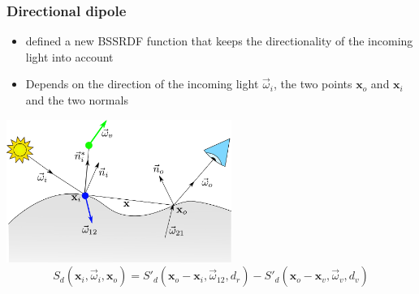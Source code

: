\documentclass{beamer}
\newcommand{\vomega}{\vec{\omega}}
\newcommand{\x}{\mathbf{x}}
\begin{document}
\begin{frame}
    \frametitle{Directional dipole}
		\vspace{0.3cm}
			\begin{itemize}
				\item \citep{IMM2013-06646} defined a new BSSRDF function that keeps the directionality of the incoming light into account \\		
				\item Depends on the direction of the incoming light $\vomega_i$, the two points $\x_o$ and $\x_i$ and the two normals
			\end{itemize}
				\centering
				\vspace{0.2cm}
				\includegraphics[width=0.55\textwidth]{jeppe}
			$$
			S_d(\x_i, \vomega_i, \x_o) = S'_d(\x_o - \x_i, \vomega_{12}, d_r) - S'_d(\x_o - \x_v, \vomega_{v}, d_v)
			$$

\end{frame}
\end{document}
